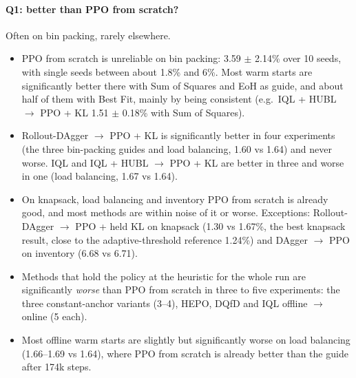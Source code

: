 \documentclass[11pt,a4paper]{article}
\begin{document}
\paragraph{Q1: better than PPO from scratch?} Often on bin packing, rarely elsewhere.
\begin{itemize}[leftmargin=*]
\item PPO from scratch is unreliable on bin packing: 3.59 $\pm$ 2.14\% over 10 seeds, with single seeds between
  about 1.8\% and 6\%. Most warm starts are significantly better there with Sum of Squares and EoH as guide, and
  about half of them with Best Fit, mainly by being consistent (e.g.\ IQL + HUBL $\to$ PPO + KL 1.51 $\pm$ 0.18\%
  with Sum of Squares).
\item Rollout-DAgger $\to$ PPO + KL is significantly better in four experiments (the three bin-packing guides and load
  balancing, 1.60 vs 1.64) and never worse. IQL and IQL + HUBL $\to$ PPO + KL are better in three and worse in one
  (load balancing, 1.67 vs 1.64).
\item On knapsack, load balancing and inventory PPO from scratch is already good, and most methods are within noise
  of it or worse. Exceptions: Rollout-DAgger $\to$ PPO + held KL on knapsack (1.30 vs 1.67\%, the best knapsack
  result, close to the adaptive-threshold reference 1.24\%) and DAgger $\to$ PPO on inventory (6.68 vs 6.71).
\item Methods that hold the policy at the heuristic for the whole run are significantly \emph{worse} than PPO from
  scratch in three to five experiments: the three constant-anchor variants (3--4), HEPO, DQfD and IQL offline $\to$
  online (5 each).
\item Most offline warm starts are slightly but significantly worse on load balancing (1.66--1.69 vs 1.64), where PPO
  from scratch is already better than the guide after 174k steps.
\end{itemize}
\end{document}
